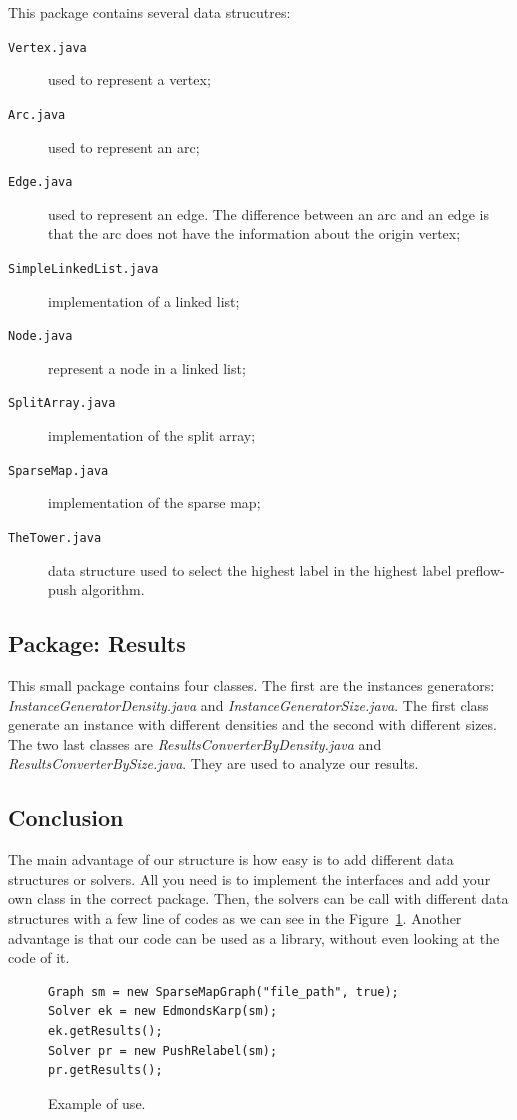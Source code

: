 This package contains several data strucutres: 
\begin{description}
	\item[\texttt{Vertex.java}] used to represent a vertex;
	\item[\texttt{Arc.java}] used to represent an arc;
	\item[\texttt{Edge.java}] used to represent an edge. The difference between an arc and an edge is that the arc does not have the information about the origin vertex;
	\item[\texttt{SimpleLinkedList.java}] implementation of a linked list;
	\item[\texttt{Node.java}] represent a node in a linked list;
	\item[\texttt{SplitArray.java}] implementation of the split array;
	\item[\texttt{SparseMap.java}] implementation of the sparse map;
	\item[\texttt{TheTower.java}] data structure used to select the highest label in the highest label preflow-push algorithm.
\end{description}

\subsection{Package: Results}

This small package contains four classes. The first are the instances generators: \textit{InstanceGeneratorDensity.java} and \textit{InstanceGeneratorSize.java}. The first class generate an instance with different densities and the second with different sizes. The two last classes are \textit{ResultsConverterByDensity.java} and \textit{ResultsConverterBySize.java}. They are used to analyze our results.

\subsection{Conclusion}


The main advantage of our structure is how easy is to add different data structures or solvers. All you need is to implement the interfaces and add your own class in the correct package. Then, the solvers can be call with different data structures with a few line of codes as we can see in the Figure~\ref{simple_code}. Another advantage is that our code can be used as a library, without even looking at the code of it.

\begin{figure}
\begin{lstlisting}
Graph sm = new SparseMapGraph("file_path", true);
Solver ek = new EdmondsKarp(sm);
ek.getResults();
Solver pr = new PushRelabel(sm);
pr.getResults();
\end{lstlisting}
\caption{Example of use.}
\label{simple_code}
\end{figure}


